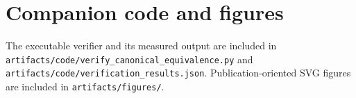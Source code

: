 \documentclass[11pt]{article}
\theoremstyle{remark}
\begin{document}
\section{Companion code and figures}

The executable verifier and its measured output are included in
\texttt{artifacts/code/verify\_canonical\_equivalence.py} and
\texttt{artifacts/code/verification\_results.json}. Publication-oriented SVG
figures are included in \texttt{artifacts/figures/}.


\end{document}
